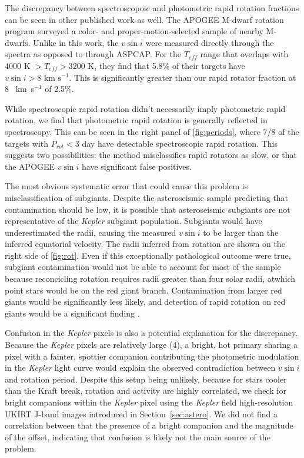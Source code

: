 \documentclass[manuscript]{aastex6}
\newcommand{\vsini}{\ensuremath{v \sin i}}
\newcommand{\Kepler}{\mbox{\textit{Kepler}}}
\newcommand{\Teff}{\ensuremath{T_{eff}}}
\newcommand{\kms}{\textrm{~km~s}\ensuremath{^{-1}}}
\begin{document}
The discrepancy between spectroscopoic and photometric rapid rotation fractions
can be seen in other published work as well. The APOGEE M-dwarf rotation
program \citep{Gilhool18} surveyed a color- and proper-motion-selected sample
of nearby M-dwarfs. Unlike in this work, the \vsini{} were measured directly
through the spectra as opposed to through ASPCAP\@. For the \Teff{} range that
overlaps with \citet{McQuillan14} \(4000 \textrm{ K } > \Teff > 3200\) K, they 
find that 5.8\% of their targets have \(\vsini > 8 \kms\). This is 
significantly greater than our rapid rotator fraction at 8 \kms{} of 2.5\%. 

While spectroscopic rapid rotation didn't necessarily imply photometric
rapid rotation, we find that photometric rapid rotation is generally
reflected in spectroscopy. This can be seen in the right panel of
\cref{fig:periods}, where 7/8 of the targets with \(P_{rot} < 3\) day
have detectable spectroscopic rapid rotation. This suggests two
possibilities: the \citep{McQuillan14} method misclassifies rapid
rotators as slow, or that the APOGEE \vsini{} have significant false
positives.

The most obvious systematic error that could cause this problem is
misclassification of subgiants. Despite the asteroseismic sample
predicting that contamination should be low, it is possible that 
asteroseismic subgiants are not representative of the \Kepler{} subgiant 
population. Subgiants would have underestimated the radii, causing the 
measured \vsini{} to be larger than the inferred equatorial velocity.
The radii inferred from rotation are shown on the right side of
\cref{fig:rot}. Even if this
exceptionally pathological outcome were true, subgiant contamination
would not be able to account for most of the sample because reconcicling
rotation requires radii greater than four solar radii, atwhich point
stars would be on the red giant branch. Contamination from larger red giants 
would be significantly less likely, and detection of rapid rotation on red 
giants would be a significant finding \citep{Tayar15}.

Confusion in the \Kepler{} pixels is also a potential explanation for the
discrepancy. Because the \Kepler{} pixels are relatively large (4\arcsec), a 
bright, hot primary sharing a pixel with a fainter, spottier companion 
contributing the photometric modulation in the
\Kepler{} light curve would explain the observed contradiction between
\vsini{} and rotation period. Despite this setup being unlikely, because for 
stars cooler than the Kraft break, rotation and activity are highly 
correlated, we check for bright companions
within the \Kepler{} pixel using the \Kepler{} field high-resolution UKIRT
J-band images introduced in Section~\ref{sec:astero}. We did not find a 
correlation between that the presence of a bright companion and the magnitude 
of the offset, indicating that confusion is likely not the main source of the 
problem.
\end{document}
